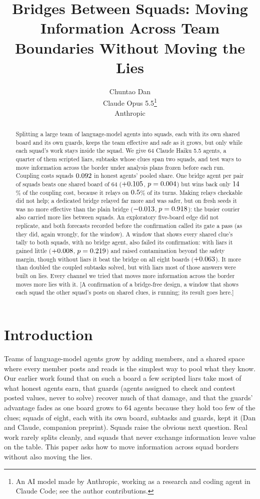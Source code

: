 \documentclass{article}
\title{Bridges Between Squads: Moving Information Across Team Boundaries Without Moving the Lies}
\author{%
  Chuntao Dan \\
  \And
  Claude Opus 5.5\thanks{An AI model made by Anthropic, working as a research and coding agent in Claude Code; see the author contributions.} \\
  Anthropic \\
}
\newcommand{\pending}[1]{\textcolor{orange!70!black}{[#1]}}
\begin{document}
\maketitle

\begin{abstract}
Splitting a large team of language-model agents into squads, each with its own shared board and its own guards, keeps the team effective and safe as it grows, but only while each squad's work stays inside the squad. We give 64 Claude Haiku 5.5 agents, a quarter of them scripted liars, subtasks whose clues span two squads, and test ways to move information across the border under analysis plans frozen before each run. Coupling costs squads $0.092$ in honest agents' pooled share. One bridge agent per pair of squads beats one shared board of 64 ($+0.105$, $p = 0.004$) but wins back only $14$\% of the coupling cost, because it relays on $0.5$\% of its turns. Making relays checkable did not help; a dedicated bridge relayed far more and was safer, but on fresh seeds it was no more effective than the plain bridge ($-0.013$, $p = 0.918$): the busier courier also carried more lies between squads. An exploratory five-board edge did not replicate, and both forecasts recorded before the confirmation called its gate a pass\ifCOneD{} (as they did, again wrongly, for the window)\fi.
\ifCOneD
A window that shows every shared clue's tally to both squads, with no bridge agent, also failed its confirmation: with liars it gained little ($+0.008$, $p = 0.219$) and raised contamination beyond the safety margin, though without liars it beat the bridge on all eight boards ($+0.063$). It more than doubled the coupled subtasks solved, but with liars most of those answers were built on lies. Every channel we tried that moves more information across the border moves more lies with it.
\else
\pending{A confirmation of a bridge-free design, a window that shows each squad the other squad's posts on shared clues, is running; its result goes here.}
\fi
\end{abstract}

\section{Introduction}

Teams of language-model agents grow by adding members, and a shared space where every member posts and reads is the simplest way to pool what they know. Our earlier work found that on such a board a few scripted liars take most of what honest agents earn, that guards (agents assigned to check and contest posted values, never to solve) recover much of that damage, and that the guards' advantage fades as one board grows to 64 agents because they hold too few of the clues; squads of eight, each with its own board, subtasks and guards, kept it (Dan and Claude, companion preprint). Squads raise the obvious next question. Real work rarely splits cleanly, and squads that never exchange information leave value on the table. This paper asks how to move information across squad borders without also moving the lies.
\end{document}
